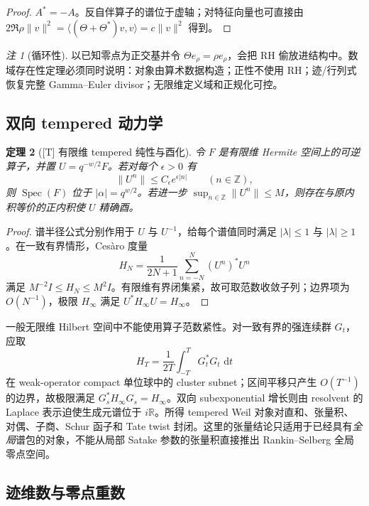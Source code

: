 \documentclass[UTF8,11pt,a4paper]{ctexart}
\newtheorem{theorem}{定理}[section]
\theoremstyle{definition}
\theoremstyle{remark}
\newtheorem{remark}[theorem]{注}
\newcommand{\R}{\mathbb R}
\newcommand{\Spec}{\operatorname{Spec}}
\newcommand{\dd}{\,\mathrm d}
\newcommand{\1}{\mathbf 1}
\newcommand{\statusT}{\textnormal{[T]}}
\begin{document}
\begin{proof}
$A^*=-A$。反自伴算子的谱位于虚轴；对特征向量也可直接由
$2\Re\rho\|v\|^2=\langle(\Theta+\Theta^*)v,v\rangle=c\|v\|^2$ 得到。
\end{proof}

\begin{remark}[循环性]
以已知零点为正交基并令 $\Theta e_\rho=\rho e_\rho$，会把 RH 偷放进结构中。数域存在性定理必须同时说明：对象由算术数据构造；正性不使用 RH；迹/行列式恢复完整 Gamma--Euler divisor；无限维定义域和正规化可控。
\end{remark}

\subsection{双向 tempered 动力学}

\begin{theorem}[\statusT{} 有限维 tempered 纯性与酉化]\label{thm:tempered}
令 $F$ 是有限维 Hermite 空间上的可逆算子，并置 $U=q^{-w/2}F$。若对每个 $\epsilon>0$ 有
\[
  \|U^n\|\leq C_\epsilon e^{\epsilon|n|}\qquad(n\in\mathbb Z),
\]
则 $\Spec(F)$ 位于 $|\alpha|=q^{w/2}$。若进一步 $\sup_{n\in\mathbb Z}\|U^n\|\leq M$，则存在与原内积等价的正内积使 $U$ 精确酉。
\end{theorem}

\begin{proof}
谱半径公式分别作用于 $U$ 与 $U^{-1}$，给每个谱值同时满足 $|\lambda|\leq1$ 与 $|\lambda|\geq1$。在一致有界情形，Ces\`aro 度量
\[
  H_N=\frac1{2N+1}\sum_{n=-N}^N(U^n)^*U^n
\]
满足 $M^{-2}I\leq H_N\leq M^2I$。有限维有界闭集紧，故可取范数收敛子列；边界项为 $O(N^{-1})$，极限 $H_\infty$ 满足 $U^*H_\infty U=H_\infty$。
\end{proof}

一般无限维 Hilbert 空间中不能使用算子范数紧性。对一致有界的强连续群 $G_t$，应取
\[
 H_T=\frac1{2T}\int_{-T}^{T}G_t^*G_t\,\dd t
\]
在 weak-operator compact 单位球中的 cluster subnet；区间平移只产生 $O(T^{-1})$ 的边界，故极限满足 $G_s^*H_\infty G_s=H_\infty$。双向 subexponential 增长则由 resolvent 的 Laplace 表示迫使生成元谱位于 $i\R$。所得 tempered Weil 对象对直和、张量积、对偶、子商、Schur 函子和 Tate twist 封闭。这里的张量结论只适用于已经具有\emph{全局}谱包的对象，不能从局部 Satake 参数的张量积直接推出 Rankin--Selberg 全局零点空间。

\subsection{迹维数与零点重数}
\end{document}
